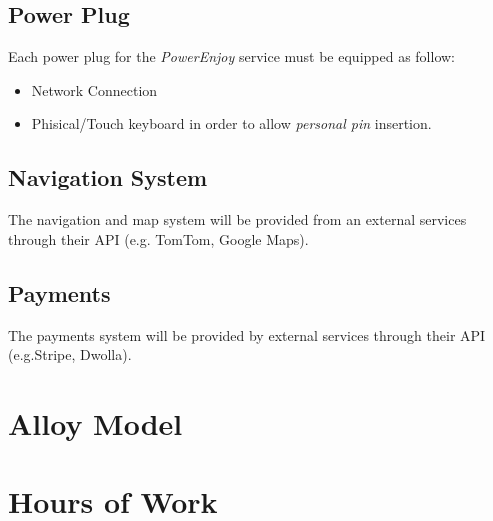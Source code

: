 \documentclass[english]{article}
\newcommand{\powerenjoy}{\textit{PowerEnjoy }}
\newcommand{\personalpin}{\textit{personal pin }}
\begin{document}
		
\subsection{Power Plug}
	Each power plug for the \powerenjoy service must be equipped as follow:
		\begin{itemize}
			\item Network Connection
			\item Phisical/Touch keyboard in order to allow \personalpin insertion.
		\end{itemize}
\subsection{Navigation System}
	The navigation and map system will be provided from an external services through their API (e.g. TomTom, Google Maps).
\subsection{Payments}
	The payments system will be provided by external services through their API (e.g.Stripe, Dwolla).

\section{Alloy Model}
	
	
	

\section{Hours of Work}
\end{document}
